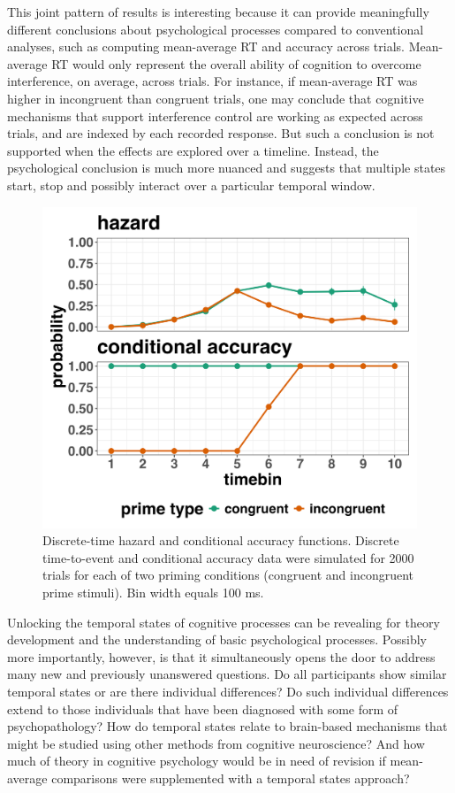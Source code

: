 \documentclass[
  man, donotrepeattitle,floatsintext]{apa6}
\begin{document}
This joint pattern of results is interesting because it can provide meaningfully different conclusions about psychological processes compared to conventional analyses, such as computing mean-average RT and accuracy across trials. Mean-average RT would only represent the overall ability of cognition to overcome interference, on average, across trials. For instance, if mean-average RT was higher in incongruent than congruent trials, one may conclude that cognitive mechanisms that support interference control are working as expected across trials, and are indexed by each recorded response. But such a conclusion is not supported when the effects are explored over a timeline. Instead, the psychological conclusion is much more nuanced and suggests that multiple states start, stop and possibly interact over a particular temporal window.



\begin{figure}[H]

{\centering \includegraphics[width=0.8\linewidth,height=0.67\textheight,]{../sims/figures/haz_acc_single} 

}

\caption{Discrete-time hazard and conditional accuracy functions. Discrete time-to-event and conditional accuracy data were simulated for 2000 trials for each of two priming conditions (congruent and incongruent prime stimuli). Bin width equals 100 ms.}\label{fig:plot3}
\end{figure}

Unlocking the temporal states of cognitive processes can be revealing for theory development and the understanding of basic psychological processes. Possibly more importantly, however, is that it simultaneously opens the door to address many new and previously unanswered questions. Do all participants show similar temporal states or are there individual differences? Do such individual differences extend to those individuals that have been diagnosed with some form of psychopathology? How do temporal states relate to brain-based mechanisms that might be studied using other methods from cognitive neuroscience? And how much of theory in cognitive psychology would be in need of revision if mean-average comparisons were supplemented with a temporal states approach?
\end{document}
